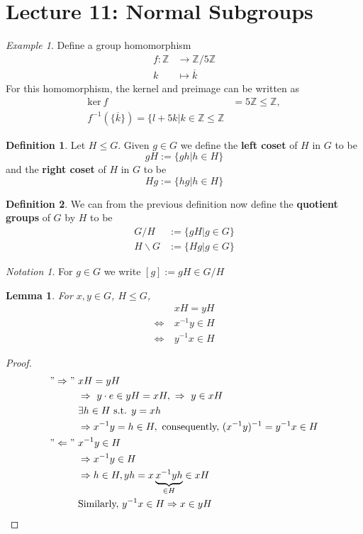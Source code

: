\documentclass{article}
\newtheorem{lemma}[theorem]{Lemma}
\theoremstyle{definition}
\newtheorem{definition}{Definition}[section]
\theoremstyle{remark}
\newtheorem*{example}{Example}
\newtheorem*{notation}{Notation}
\begin{document}
\section{Lecture 11: Normal Subgroups}
\begin{example}
	Define a group homomorphism
	\begin{align*}
		f:\mathbb{Z}&\rightarrow\mathbb{Z}/5\mathbb{Z}\\
		k&\mapsto\overline{k}
	\end{align*}
	For this homomorphism, the kernel and preimage can be written as
	\begin{align*}
		\mathrm{ker}~f&=5\mathbb{Z}\leq\mathbb{Z},\\
		f^{-1}(\lbrace \overline{k}\rbrace)=\lbrace l+5k|k\in\mathbb{Z}\leq\mathbb{Z}
	\end{align*}
\end{example}
\begin{definition}
	Let $H\leq G$. Given $g\in G$ we define the \textbf{left coset} of $H$ in $G$ to be
	\begin{equation}
		gH:=\lbrace gh|h\in H \rbrace
	\end{equation}
	and the \textbf{right coset} of $H$ in $G$ to be
	\begin{equation}
		Hg:=\lbrace hg|h\in H \rbrace
	\end{equation}
\end{definition}
\begin{definition}
	We can from the previous definition now define the \textbf{quotient groups} of $G$ by $H$ to be
	\begin{align}
		G/H&:=\lbrace gH|g\in G\rbrace\\
		H\backslash G&:=\lbrace Hg|g\in G\rbrace
	\end{align}
\end{definition}
\begin{notation}
	For $g\in G$ we write $[g]:=gH\in G/H$
\end{notation}
\begin{lemma}
	For $x,y\in G$, $H\leq G$,
	\begin{align*}
		&xH=yH\\
		\Leftrightarrow~&x^{-1}y\in H\\
		\Leftrightarrow~&y^{-1}x\in H
	\end{align*}
\end{lemma}
\begin{proof}
	\begin{align*}
		"\Rightarrow"~&xH=yH\\
		&\Rightarrow~y\cdot e\in yH=xH,~\Rightarrow~y\in xH\\
		&\exists h\in H \text{ s.t. } y=xh\\
		&\Rightarrow x^{-1}y=h\in H, \text{ consequently, }(x^{-1}y)^{-1}=y^{-1}x\in H\\
		"\Leftarrow"~&x^{-1}y\in H\\
		&\Rightarrow x^{-1}y\in H\\
		&\Rightarrow h\in H, yh=x\underbrace{x^{-1}yh}_{\in H}\in xH\\ 
		&\text{Similarly, }y^{-1}x\in H\Rightarrow x\in yH
	\end{align*}
\end{proof}
\end{document}
